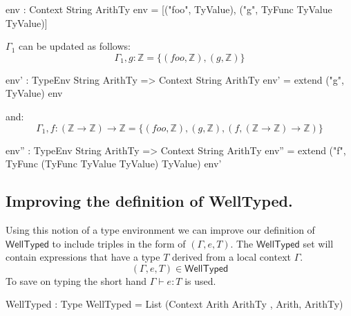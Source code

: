 \begin{code}
env : Context String ArithTy
env = [("foo", TyValue), ("g", TyFunc TyValue TyValue)]
\end{code}

\noindent
$\Gamma_{1}$ can be updated as follows:
\[
\Gamma_{1},g:\mathbb{Z} =\{(foo,\mathbb{Z}),(g,\mathbb{Z})\}
\]
\begin{code}
env' : TypeEnv String ArithTy => Context String ArithTy
env' = extend ("g", TyValue) env
\end{code}
\noindent
and:
\[
\Gamma_{1},f:(\mathbb{Z}\rightarrow\mathbb{Z})\rightarrow\mathbb{Z} =\{(foo,\mathbb{Z}),(g,\mathbb{Z}),(f,(\mathbb{Z}\rightarrow\mathbb{Z})\rightarrow\mathbb{Z})\}
\]
\begin{code}
env'' : TypeEnv String ArithTy => Context String ArithTy
env'' = extend ("f", TyFunc (TyFunc TyValue TyValue)
                             TyValue)
                 env'
\end{code}

\subsection{Improving the definition of \textsf{WellTyped}.}
\label{sec:types:example}

Using this notion of a type environment we can improve our definition of $\mathsf{WellTyped}$ to include triples in the form of $(\Gamma,e,T)$.
The $\mathsf{WellTyped}$ set will contain expressions that have a type $T$ derived from a local context $\Gamma$.
\[
(\Gamma,e,T)\in\mathsf{WellTyped}
\]
\noindent
To save on typing the short hand $\Gamma\vdash e:T$ is used.

\begin{code}
WellTyped : Type
WellTyped = List (Context Arith ArithTy , Arith, ArithTy)
\end{code}

